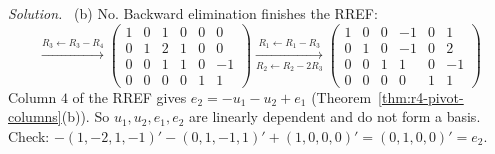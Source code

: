 \documentclass[12pt]{article}
\theoremstyle{definition}
\newenvironment{solution}{\par\noindent\textit{Solution.}\ }{\par\smallskip}
\begin{document}
\begin{solution}
(b) No. Backward elimination finishes the RREF:
\[
\xrightarrow{R_3\leftarrow R_3-R_4}
\left(\begin{array}{cc|cccc}1&0&1&0&0&0\\0&1&2&1&0&0\\0&0&1&1&0&-1\\0&0&0&0&1&1\end{array}\right)
\xrightarrow[R_2\leftarrow R_2-2R_3]{R_1\leftarrow R_1-R_3}
\left(\begin{array}{cc|cccc}1&0&0&-1&0&1\\0&1&0&-1&0&2\\0&0&1&1&0&-1\\0&0&0&0&1&1\end{array}\right)
\]
Column \(4\) of the RREF gives \(e_2=-u_1-u_2+e_1\) (Theorem~\ref{thm:r4-pivot-columns}(b)). So
\(u_1,u_2,e_1,e_2\) are linearly dependent and do not form a basis. Check:
\(-(1,-2,1,-1)'-(0,1,-1,1)'+(1,0,0,0)'=(0,1,0,0)'=e_2\).
\end{solution}
\end{document}
